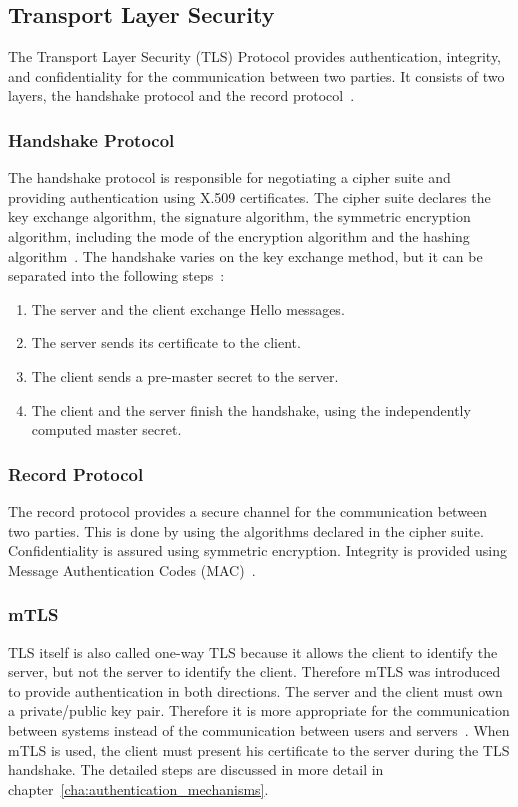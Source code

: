 \subsection{Transport Layer Security}
The Transport Layer Security (TLS) Protocol provides authentication, integrity, and confidentiality for the communication between two parties.
It consists of two layers, the handshake protocol and the record protocol~\cite{turnertls}.

\subsubsection{Handshake Protocol}
The handshake protocol is responsible for negotiating a cipher suite and providing authentication using X.509 certificates.
The cipher suite declares the key exchange algorithm, the signature algorithm, the symmetric encryption algorithm, including the mode of the encryption algorithm and the hashing algorithm~\cite{turnertls, kurbatov2021design}.
The handshake varies on the key exchange method, but it can be separated into the following steps~\cite{krawczyk2013security}:
\begin{enumerate}
    \item The server and the client exchange Hello messages.
    \item The server sends its certificate to the client.
    \item The client sends a pre-master secret to the server.
    \item The client and the server finish the handshake, using the independently computed master secret.
\end{enumerate}

\subsubsection{Record Protocol}
The record protocol provides a secure channel for the communication between two parties.
This is done by using the algorithms declared in the cipher suite.
Confidentiality is assured using symmetric encryption.
Integrity is provided using Message Authentication Codes (MAC)~\cite{kurbatov2021design, krawczyk2013security}.

\subsubsection{mTLS} \label{sec:mtls}
TLS itself is also called one-way TLS because it allows the client to identify the server, but not the server to identify the client.
Therefore mTLS was introduced to provide authentication in both directions.
The server and the client must own a private/public key pair.
Therefore it is more appropriate for the communication between systems instead of the communication between users and servers~\cite{dias2020microservices}. 
When mTLS is used, the client must present his certificate to the server during the TLS handshake.
The detailed steps are discussed in more detail in chapter~\ref{cha:authentication_mechanisms}.

